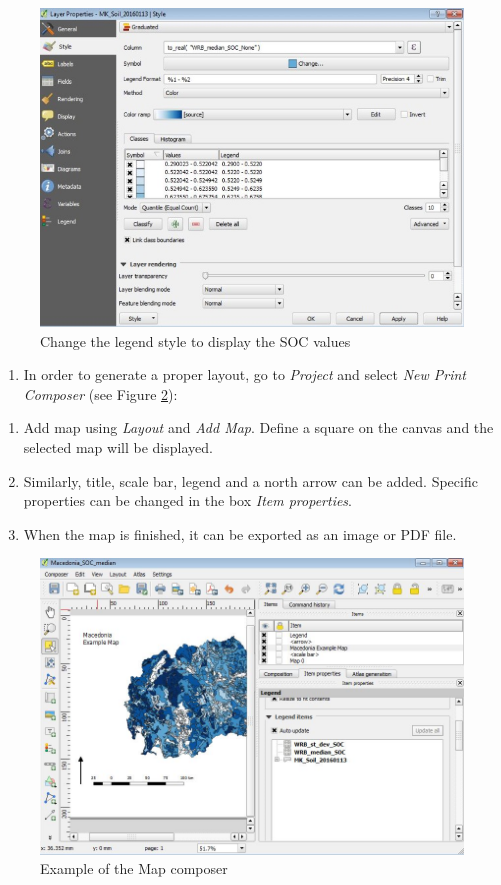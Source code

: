 \documentclass[10pt,b5paper,]{book}
\providecommand{\tightlist}{%
  \setlength{\itemsep}{0pt}\setlength{\parskip}{0pt}}
\theoremstyle{definition}
\theoremstyle{definition}
\theoremstyle{definition}
\theoremstyle{remark}
\begin{document}
\begin{figure}

{\centering \includegraphics[width=0.8\linewidth]{images/Conv_upscaling7} 

}

\caption{Change the legend style to display the SOC values}\label{fig:legendstyle}
\end{figure}

\begin{enumerate}
\def\labelenumi{\arabic{enumi}.}
\setcounter{enumi}{8}
\tightlist
\item
  In order to generate a proper layout, go to \emph{Project} and select
  \emph{New Print Composer} (see Figure \ref{fig:mapcomp}):
\end{enumerate}

\begin{enumerate}
\def\labelenumi{\alph{enumi}.}
\tightlist
\item
  Add map using \emph{Layout} and \emph{Add Map}. Define a square on the
  canvas and the selected map will be displayed.
\item
  Similarly, title, scale bar, legend and a north arrow can be added.
  Specific properties can be changed in the box \emph{Item properties}.
\item
  When the map is finished, it can be exported as an image or PDF file.
\end{enumerate}

\begin{figure}

{\centering \includegraphics[width=0.8\linewidth]{images/Conv_upscaling8} 

}

\caption{Example of the Map composer}\label{fig:mapcomp}
\end{figure}
\end{document}
